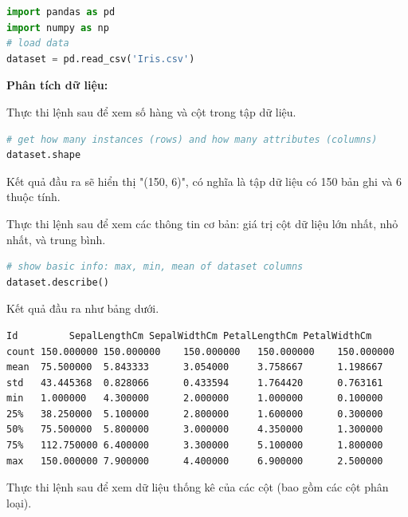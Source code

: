 \begin{center}
\begin{lstlisting}[language=Python,breaklines=true]
import pandas as pd
import numpy as np
# load data
dataset = pd.read_csv('Iris.csv')
\end{lstlisting}
\end{center}

\textbf{Phân tích dữ liệu:}

Thực thi lệnh sau để xem số hàng và cột trong tập dữ liệu.

\begin{center}
\begin{lstlisting}[language=Python,breaklines=true]
# get how many instances (rows) and how many attributes (columns)
dataset.shape
\end{lstlisting}
\end{center}

Kết quả đầu ra sẽ hiển thị "(150, 6)", có nghĩa là tập dữ liệu
có 150 bản ghi và 6 thuộc tính.

Thực thi lệnh sau để xem các thông tin cơ bản:
giá trị cột dữ liệu lớn nhất, nhỏ nhất, và trung bình.

\begin{center}
\begin{lstlisting}[language=Python,breaklines=true]
# show basic info: max, min, mean of dataset columns
dataset.describe()
\end{lstlisting}
\end{center}

Kết quả đầu ra như bảng dưới.

\begin{center}
\begin{lstlisting}[basicstyle=\fontsize{10}{13}\selectfont\ttfamily]
      Id         SepalLengthCm SepalWidthCm PetalLengthCm PetalWidthCm
count 150.000000 150.000000    150.000000   150.000000    150.000000
mean  75.500000  5.843333      3.054000     3.758667      1.198667
std   43.445368  0.828066      0.433594     1.764420      0.763161
min   1.000000   4.300000      2.000000     1.000000      0.100000
25%   38.250000  5.100000      2.800000     1.600000      0.300000
50%   75.500000  5.800000      3.000000     4.350000      1.300000
75%   112.750000 6.400000      3.300000     5.100000      1.800000
max   150.000000 7.900000      4.400000     6.900000      2.500000
\end{lstlisting}
\end{center}

Thực thi lệnh sau để xem dữ liệu thống kê của các cột (bao gồm các cột phân loại).

